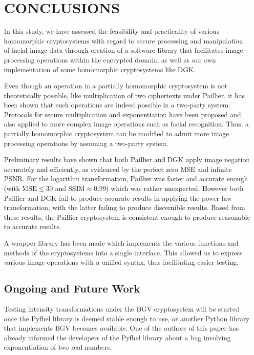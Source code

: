 \chapter{CONCLUSIONS}
In this study, we have assessed the feasibility and practicality of various homomorphic cryptosystems with regard to secure processing and manipulation of facial image data through creation of a software library that facilitates image processing operations within the encrypted domain, as well as our own implementation of some homomorphic cryptosystems like DGK.

Even though an operation in a partially homomorphic cryptosystem is not theoretically possible, like multiplication of two ciphertexts under Paillier, it has been shown that such operations are indeed possible in a two-party system. Protocols for secure multiplication and exponentiation have been proposed and also applied to more complex image operations such as facial recognition. Thus, a partially homomorphic cryptosystem can be modified to admit more image processing operations by assuming a two-party system.

Preliminary results have shown that both Paillier and DGK apply image negation accurately and efficiently, as evidenced by the perfect zero MSE and infinite PSNR. For the logarithm transformation, Paillier was faster and accurate enough (with $\text{MSE} \le 30$ and $\text{SSIM} \approx 0.99$) which was rather unexpected. However both Paillier and DGK fail to produce accurate results in applying the power-law transformation, with the latter failing to produce discernible results. Based from these results, the Paillier cryptosystem is consistent enough to produce reasonable to accurate results.

A wrapper library has been made which implements the various functions and methods of the cryptosystems into a single interface. This allowed us to express various image operations with a unified syntax, thus facilitating easier testing.

\section{Ongoing and Future Work}
Testing intensity transformations under the BGV cryptosystem will be started once the Pyfhel library is deemed stable enough to use, or another Python library that implements BGV becomes available.
One of the authors of this paper has already informed the developers of the Pyfhel library about a bug involving exponentiation of two real numbers.

